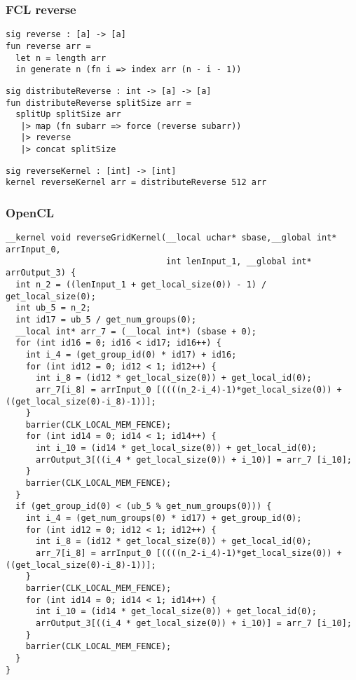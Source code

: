 \documentclass{beamer}
\begin{document}
\begin{frame}[fragile]
\frametitle{FCL reverse}

\begin{verbatim}
sig reverse : [a] -> [a]
fun reverse arr =
  let n = length arr
  in generate n (fn i => index arr (n - i - 1))
\end{verbatim}

\pause
\begin{verbatim}
sig distributeReverse : int -> [a] -> [a]
fun distributeReverse splitSize arr =
  splitUp splitSize arr
   |> map (fn subarr => force (reverse subarr))
   |> reverse
   |> concat splitSize
\end{verbatim}

\pause
\begin{verbatim}
sig reverseKernel : [int] -> [int]
kernel reverseKernel arr = distributeReverse 512 arr
\end{verbatim}
\end{frame}


\begin{frame}[fragile]
  \frametitle{OpenCL}
{\tiny
  \begin{verbatim}
__kernel void reverseGridKernel(__local uchar* sbase,__global int* arrInput_0,
                                int lenInput_1, __global int* arrOutput_3) {
  int n_2 = ((lenInput_1 + get_local_size(0)) - 1) / get_local_size(0);
  int ub_5 = n_2;
  int id17 = ub_5 / get_num_groups(0);
  __local int* arr_7 = (__local int*) (sbase + 0);
  for (int id16 = 0; id16 < id17; id16++) {
    int i_4 = (get_group_id(0) * id17) + id16;
    for (int id12 = 0; id12 < 1; id12++) {
      int i_8 = (id12 * get_local_size(0)) + get_local_id(0);
      arr_7[i_8] = arrInput_0 [((((n_2-i_4)-1)*get_local_size(0)) + ((get_local_size(0)-i_8)-1))];
    }
    barrier(CLK_LOCAL_MEM_FENCE);
    for (int id14 = 0; id14 < 1; id14++) {
      int i_10 = (id14 * get_local_size(0)) + get_local_id(0);
      arrOutput_3[((i_4 * get_local_size(0)) + i_10)] = arr_7 [i_10];
    }
    barrier(CLK_LOCAL_MEM_FENCE);
  }
  if (get_group_id(0) < (ub_5 % get_num_groups(0))) {
    int i_4 = (get_num_groups(0) * id17) + get_group_id(0);
    for (int id12 = 0; id12 < 1; id12++) {
      int i_8 = (id12 * get_local_size(0)) + get_local_id(0);
      arr_7[i_8] = arrInput_0 [((((n_2-i_4)-1)*get_local_size(0)) + ((get_local_size(0)-i_8)-1))];
    }
    barrier(CLK_LOCAL_MEM_FENCE);
    for (int id14 = 0; id14 < 1; id14++) {
      int i_10 = (id14 * get_local_size(0)) + get_local_id(0);
      arrOutput_3[((i_4 * get_local_size(0)) + i_10)] = arr_7 [i_10];
    }
    barrier(CLK_LOCAL_MEM_FENCE);
  }
}
\end{verbatim}
}
\end{frame}
\end{document}
